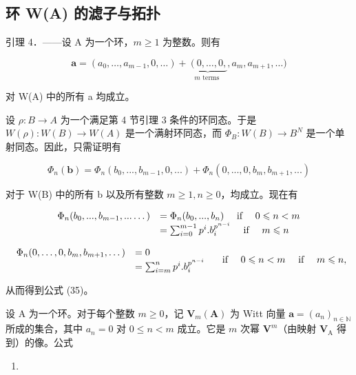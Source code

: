 \subsection{环 W(A) 的滤子与拓扑}

引理 4．——设 A 为一个环，\(m \geqslant 1\) 为整数。则有

\[
\boldsymbol {a} = \left(a _ {0}, \dots , a _ {m - 1}, 0, \dots\right) + \underbrace {\left(0 , \dots , 0 , \right.} _ {m \text { terms }}, a _ {m}, a _ {m + 1}, \dots)\tag{34}
\]

对 W(A) 中的所有 a 均成立。

设 \(\rho: B \to A\) 为一个满足第 4 节引理 3 条件的环同态。于是 \(W(\rho): W(B) \to W(A)\) 是一个满射环同态，而 \(\Phi_B: W(B) \to B^N\) 是一个单射同态。因此，只需证明有

\[
\Phi_ {n} (\boldsymbol {b}) = \Phi_ {n} (b _ {0},..., b _ {m - 1}, 0,...) + \Phi_ {n} (0,..., 0, b _ {m}, b _ {m + 1},...) \tag{35}
\]

对于 W(B) 中的所有 b 以及所有整数 \(m \geqslant 1, n \geqslant 0\)，均成立。现在有

\[
\begin{array}{r l} \Phi_ {n} (b _ {0},..., b _ {m - 1},... \dots) & = \Phi_ {n} (b _ {0},..., b _ {n}) \quad \text { if } \quad 0 \leqslant n <   m \\ & = \sum_ {i = 0} ^ {m - 1} p ^ {i}. b _ {i} ^ {p ^ {n - i}} \quad \text { if } \quad m \leqslant n \end{array}
\]

\[
\begin{array}{r l} \Phi_ {n} (0, \dots , 0, b _ {m}, b _ {m + 1}, \dots) & = 0 \\ & = \sum_ {i = m} ^ {n} p ^ {i}. b _ {i} ^ {p ^ {n - i}} \end{array} \quad \text { if } \quad 0 \leqslant n <   m \quad \text { if } \quad m \leqslant n,
\]

从而得到公式 (35)。

设 A 为一个环。对于每个整数 \(m \geqslant 0\)，记 \(\mathbf{V}_{m}(\mathbf{A})\) 为 Witt 向量 \(\boldsymbol{a} = (a_{n})_{n \in \mathbb{N}}\) 所成的集合，其中 \(a_{n} = 0\) 对 \(0 \leqslant n < m\) 成立。它是 \(m\) 次幂 \(\mathbf{V}^{m}\)（由映射 \(\mathbf{V}_{\mathrm{A}}\) 得到）的像。公式

\begin{enumerate}
\def\labelenumi{(\arabic{enumi})}
\setcounter{enumi}{35}
\tightlist
\item
\end{enumerate}

